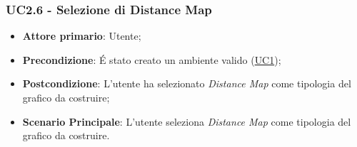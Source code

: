 \subsubsection{UC2.6 - Selezione di Distance Map}
\label{ssub:uc2.6}
\begin{itemize}
	\item \textbf{Attore primario}:	Utente;
	\item \textbf{Precondizione}:	É stato creato un ambiente valido (\hyperref[sub:uc1]{UC1});

    \item \textbf{Postcondizione}:  L'utente ha selezionato \emph{Distance Map} come tipologia del grafico da 
	costruire;

	\item \textbf{Scenario Principale}: L'utente seleziona \emph{Distance Map} come tipologia del grafico da costruire.
\end{itemize}